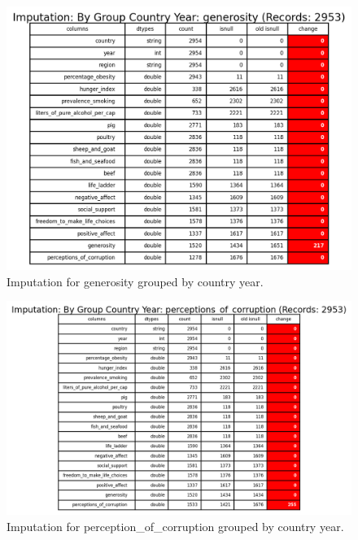                 \begin{figure}[H]
                        \centering
                        \includegraphics[scale=1]{images/dp_imputation_c_y_generosity}
                        \caption{Imputation for generosity grouped by country year.}
                        \label{fig:dp-impute-group-country-generosity}
                \end{figure}

                \begin{figure}[H]
                        \centering
                        \includegraphics[scale=1]{images/dp_imputation_c_y_perceptions_of_corruption}
                        \caption{Imputation for perception\_of\_corruption grouped by country year.}
                        \label{fig:dp-impute-group-country-perception-corruption}
                \end{figure}

